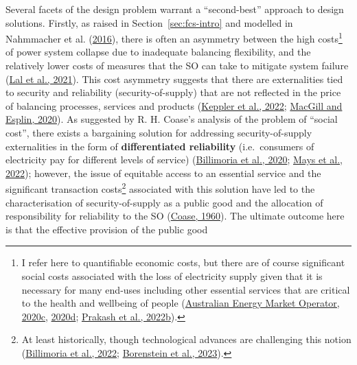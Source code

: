 \documentclass[12pt,a4paper,]{report}
\begin{document}
Several facets of the design problem warrant a ``second-best'' approach
to design solutions. Firstly, as raised in Section~\ref{sec:fcs-intro}
and modelled in Nahmmacher et al.
(\protect\hyperlink{ref-nahmmacherStrategiesShocksPower2016}{2016}),
there is often an asymmetry between the high costs\footnote{I refer here
  to quantifiable economic costs, but there are of course significant
  social costs associated with the loss of electricity supply given that
  it is necessary for many end-uses including other essential services
  that are critical to the health and wellbeing of people
  (\protect\hyperlink{ref-australianenergymarketoperatorSubmissionAERWALDO2020}{Australian
  Energy Market Operator, 2020c},
  \protect\hyperlink{ref-australianenergymarketoperator2020ISPAppendix2020}{2020d};
  \protect\hyperlink{ref-prakashResponseCapacityMechanism2022}{Prakash
  et al., 2022b}).} of power system collapse due to inadequate balancing
flexibility, and the relatively lower costs of measures that the SO can
take to mitigate system failure
(\protect\hyperlink{ref-lalEssentialSystemServices2021}{Lal et al.,
2021}). This cost asymmetry suggests that there are externalities tied
to security and reliability (security-of-supply) that are not reflected
in the price of balancing processes, services and products
(\protect\hyperlink{ref-kepplerWhySustainableProvision2022}{Keppler et
al., 2022};
\protect\hyperlink{ref-macgillEndtoendElectricityMarket2020}{MacGill and
Esplin, 2020}). As suggested by R. H. Coase's analysis of the problem of
``social cost'', there exists a bargaining solution for addressing
security-of-supply externalities in the form of \textbf{differentiated
reliability} (i.e.~consumers of electricity pay for different levels of
service)
(\protect\hyperlink{ref-billimoriaMarketDesignSystem2020}{Billimoria et
al., 2020}; \protect\hyperlink{ref-maysPrivateRiskSocial2022}{Mays et
al., 2022}); however, the issue of equitable access to an essential
service and the significant transaction costs\footnote{At least
  historically, though technological advances are challenging this
  notion
  (\protect\hyperlink{ref-billimoriaInsuranceMechanismElectricity2022}{Billimoria
  et al., 2022};
  \protect\hyperlink{ref-borensteinEconomicsElectricityReliability2023}{Borenstein
  et al., 2023}).} associated with this solution have led to the
characterisation of security-of-supply as a public good and the
allocation of responsibility for reliability to the SO
(\protect\hyperlink{ref-coaseProblemSocialCost1960}{Coase, 1960}). The
ultimate outcome here is that the effective provision of the public good
\end{document}
